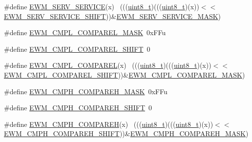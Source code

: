 \begin{DoxyCompactItemize}
\item 
\#define \hyperlink{group___e_w_m___register___masks_gaf5f891da276df3d0ec104c6aa126540e}{E\+W\+M\+\_\+\+S\+E\+R\+V\+\_\+\+S\+E\+R\+V\+I\+CE}(x)                                        ~(((\hyperlink{_p_e___types_8h_aba7bc1797add20fe3efdf37ced1182c5}{uint8\+\_\+t})(((\hyperlink{_p_e___types_8h_aba7bc1797add20fe3efdf37ced1182c5}{uint8\+\_\+t})(x))$<$$<$\hyperlink{group___e_w_m___register___masks_ga4aacdb92f0d1a2edcdf651328e741c6a}{E\+W\+M\+\_\+\+S\+E\+R\+V\+\_\+\+S\+E\+R\+V\+I\+C\+E\+\_\+\+S\+H\+I\+FT}))\&\hyperlink{group___e_w_m___register___masks_ga45e5d6d64deeb807800e044bb82f318f}{E\+W\+M\+\_\+\+S\+E\+R\+V\+\_\+\+S\+E\+R\+V\+I\+C\+E\+\_\+\+M\+A\+SK})
\item 
\#define \hyperlink{group___e_w_m___register___masks_gaed4764277fd6da7338abe074b6ca509e}{E\+W\+M\+\_\+\+C\+M\+P\+L\+\_\+\+C\+O\+M\+P\+A\+R\+E\+L\+\_\+\+M\+A\+SK}~0x\+F\+Fu
\item 
\#define \hyperlink{group___e_w_m___register___masks_ga34ba2acd3dfb6ac825d6ca812b4461fd}{E\+W\+M\+\_\+\+C\+M\+P\+L\+\_\+\+C\+O\+M\+P\+A\+R\+E\+L\+\_\+\+S\+H\+I\+FT}~0
\item 
\#define \hyperlink{group___e_w_m___register___masks_ga227fbc36660dcf0e564dd4496832155c}{E\+W\+M\+\_\+\+C\+M\+P\+L\+\_\+\+C\+O\+M\+P\+A\+R\+EL}(x)                                      ~(((\hyperlink{_p_e___types_8h_aba7bc1797add20fe3efdf37ced1182c5}{uint8\+\_\+t})(((\hyperlink{_p_e___types_8h_aba7bc1797add20fe3efdf37ced1182c5}{uint8\+\_\+t})(x))$<$$<$\hyperlink{group___e_w_m___register___masks_ga34ba2acd3dfb6ac825d6ca812b4461fd}{E\+W\+M\+\_\+\+C\+M\+P\+L\+\_\+\+C\+O\+M\+P\+A\+R\+E\+L\+\_\+\+S\+H\+I\+FT}))\&\hyperlink{group___e_w_m___register___masks_gaed4764277fd6da7338abe074b6ca509e}{E\+W\+M\+\_\+\+C\+M\+P\+L\+\_\+\+C\+O\+M\+P\+A\+R\+E\+L\+\_\+\+M\+A\+SK})
\item 
\#define \hyperlink{group___e_w_m___register___masks_ga2bba159a8c0eaace911da192c1747c73}{E\+W\+M\+\_\+\+C\+M\+P\+H\+\_\+\+C\+O\+M\+P\+A\+R\+E\+H\+\_\+\+M\+A\+SK}~0x\+F\+Fu
\item 
\#define \hyperlink{group___e_w_m___register___masks_ga02d5e37ee2e38be4d3654c4eb0854cb5}{E\+W\+M\+\_\+\+C\+M\+P\+H\+\_\+\+C\+O\+M\+P\+A\+R\+E\+H\+\_\+\+S\+H\+I\+FT}~0
\item 
\#define \hyperlink{group___e_w_m___register___masks_ga2aac9dac08a753ede317faba6cd38c39}{E\+W\+M\+\_\+\+C\+M\+P\+H\+\_\+\+C\+O\+M\+P\+A\+R\+EH}(x)                                      ~(((\hyperlink{_p_e___types_8h_aba7bc1797add20fe3efdf37ced1182c5}{uint8\+\_\+t})(((\hyperlink{_p_e___types_8h_aba7bc1797add20fe3efdf37ced1182c5}{uint8\+\_\+t})(x))$<$$<$\hyperlink{group___e_w_m___register___masks_ga02d5e37ee2e38be4d3654c4eb0854cb5}{E\+W\+M\+\_\+\+C\+M\+P\+H\+\_\+\+C\+O\+M\+P\+A\+R\+E\+H\+\_\+\+S\+H\+I\+FT}))\&\hyperlink{group___e_w_m___register___masks_ga2bba159a8c0eaace911da192c1747c73}{E\+W\+M\+\_\+\+C\+M\+P\+H\+\_\+\+C\+O\+M\+P\+A\+R\+E\+H\+\_\+\+M\+A\+SK})
$$
\end{DoxyCompactItemize}
